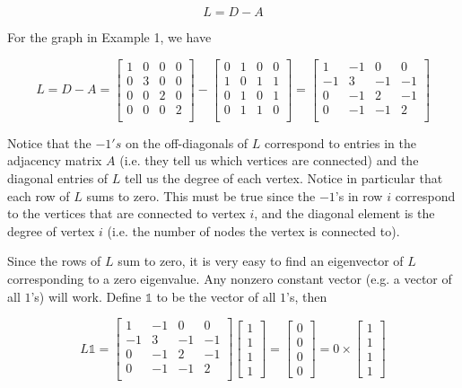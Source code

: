 \documentclass[12pt]{article}
\newcommand{\nin}{\noindent}
\newcommand{\vthree}{\vspace{3mm}}
\newcommand{\mymat}[1]{
\left[
\begin{array}{rrrrrrrrrrrrrrrrrrrrrrrrrrrrrrrrrrrrrrr}
#1
\end{array}
\right]
}
\begin{document}
\[
L = D - A
\]

\vthree

\nin For the graph in Example 1, we have

\[
L = D - A =
\mymat{
1 & 0 & 0 & 0 \\
0 & 3 & 0 & 0 \\
0 & 0 & 2 & 0 \\
0 & 0 & 0 & 2 \\
} -
\mymat{
0 & 1 & 0 & 0 \\
1 & 0 & 1 & 1 \\
0 & 1 & 0 & 1 \\
0 & 1 & 1 & 0 \\
}
=
\mymat{
1 & -1 & 0 & 0 \\
-1 & 3 & -1 & -1 \\
0 & -1 & 2 & -1 \\
0 & -1 & -1 & 2 \\
}
\]

\vthree

\nin Notice that the $-1's$ on the off-diagonals of $L$ correspond to entries in the adjacency matrix $A$ (i.e. they tell us which vertices are connected) and the diagonal entries of $L$ tell us the degree of each vertex.  Notice in particular that each row of $L$ sums to zero.  This must be true since the $-1$'s in row $i$ correspond to the vertices that are connected to vertex $i$, and the diagonal element is the degree of vertex $i$ (i.e. the number of nodes the vertex is connected to).

\vthree

\nin Since the rows of $L$ sum to zero, it is very easy to find an eigenvector of $L$ corresponding to a zero eigenvalue.  Any nonzero constant vector (e.g. a vector of all $1$'s) will work.  Define $\mathds{1}$ to be the vector of all $1$'s, then

\[
L \mathds{1} =
\mymat{
1 & -1 & 0 & 0 \\
-1 & 3 & -1 & -1 \\
0 & -1 & 2 & -1 \\
0 & -1 & -1 & 2 \\
}
\mymat{1 \\ 1 \\ 1 \\ 1}
= \mymat{ 0 \\ 0 \\ 0 \\0 }
=
0 \times
\mymat{1 \\ 1 \\ 1 \\ 1}
\]
\end{document}
